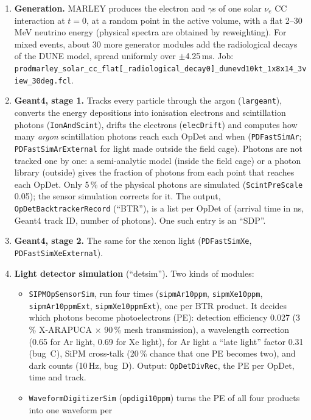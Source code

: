 \documentclass[10pt]{article}
\newcommand{\code}[1]{\texttt{#1}}
\newcommand{\fn}[1]{\nolinkurl{#1}}
\begin{document}
\begin{enumerate}[leftmargin=*]
\item \textbf{Generation.} MARLEY produces the electron and $\gamma$s of one solar $\nu_e$ CC interaction at $t=0$,
  at a random point in the active volume, with a flat 2--30\,MeV neutrino energy (physical spectra are obtained by
  reweighting). For mixed events, about 30 more generator modules add the radiological decays of the DUNE model,
  spread uniformly over $\pm$4.25\,ms. Job: \fn{prodmarley_solar_cc_flat[_radiological_decay0]_dunevd10kt_1x8x14_3view_30deg.fcl}.
\item \textbf{Geant4, stage 1.} Tracks every particle through the argon (\code{largeant}), converts the energy
  depositions into ionisation electrons and scintillation photons (\code{IonAndScint}), drifts the electrons
  (\code{elecDrift}) and computes how many \emph{argon} scintillation photons reach each OpDet and when
  (\code{PDFastSimAr}; \code{PDFastSimArExternal} for light made outside the field cage). Photons are not tracked one
  by one: a semi-analytic model (inside the field cage) or a photon library (outside) gives the fraction of photons
  from each point that reaches each OpDet. Only 5\,\% of the physical photons are simulated (\code{ScintPreScale}
  0.05); the sensor simulation corrects for it. The output, \code{OpDetBacktrackerRecord} (``BTR''), is a list per
  OpDet of (arrival time in ns, Geant4 track ID, number of photons). One such entry is an ``SDP''.
\item \textbf{Geant4, stage 2.} The same for the xenon light (\code{PDFastSimXe}, \code{PDFastSimXeExternal}).
\item \textbf{Light detector simulation} (``detsim''). Two kinds of modules:
  \begin{itemize}
  \item \code{SIPMOpSensorSim}, run four times (\code{sipmAr10ppm}, \code{sipmXe10ppm}, \code{sipmAr10ppmExt},
    \code{sipmXe10ppmExt}), one per BTR product. It decides which photons become photoelectrons (PE): detection
    efficiency 0.027 (3\,\% X-ARAPUCA $\times$ 90\,\% mesh transmission), a wavelength correction (0.65 for Ar
    light, 0.69 for Xe light), for Ar light a ``late light'' factor 0.31 (bug~C), SiPM cross-talk (20\,\% chance
    that one PE becomes two), and dark counts (10\,Hz, bug~D). Output: \code{OpDetDivRec}, the PE per OpDet, time
    and track.
  \item \code{WaveformDigitizerSim} (\code{opdigi10ppm}) turns the PE of all four products into one waveform per

\end{itemize}
\end{enumerate}
\end{document}
